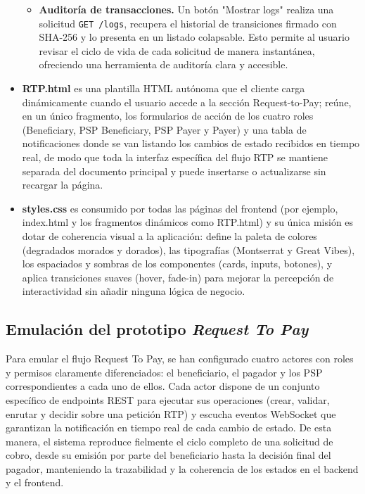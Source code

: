 \begin{itemize}
\begin{itemize}
            \item \textbf{Auditoría de transacciones.} Un botón "Mostrar logs" realiza una solicitud \texttt{GET /logs}, recupera el historial de transiciones firmado con SHA-256 y lo presenta en un listado colapsable. Esto permite al usuario revisar el ciclo de vida de cada solicitud de manera instantánea, ofreciendo una herramienta de auditoría clara y accesible.
        \end{itemize}

    \item \textbf{RTP.html} es una plantilla HTML autónoma que el cliente carga dinámicamente cuando el usuario accede a la sección Request-to-Pay; reúne, en un único fragmento, los formularios de acción de los cuatro roles (Beneficiary, PSP Beneficiary, PSP Payer y Payer) y una tabla de notificaciones donde se van listando los cambios de estado recibidos en tiempo real, de modo que toda la interfaz específica del flujo RTP se mantiene separada del documento principal y puede insertarse o actualizarse sin recargar la página.
    \item \textbf{styles.css} es consumido por todas las páginas del frontend (por ejemplo, index.html y los fragmentos dinámicos como RTP.html) y su única misión es dotar de coherencia visual a la aplicación: define la paleta de colores (degradados morados y dorados), las tipografías (Montserrat y Great Vibes), los espaciados y sombras de los componentes (cards, inputs, botones), y aplica transiciones suaves (hover, fade-in) para mejorar la percepción de interactividad sin añadir ninguna lógica de negocio. 
\end{itemize}

\subsection{Emulación del prototipo \textit{Request To Pay}}
\label{subsec:EmulacionRTP}
Para emular el flujo Request To Pay, se han configurado cuatro actores con roles y permisos claramente diferenciados: el beneficiario, el pagador y los PSP correspondientes a cada uno de ellos. Cada actor dispone de un conjunto específico de endpoints REST para ejecutar sus operaciones (crear, validar, enrutar y decidir sobre una petición RTP) y escucha eventos WebSocket que garantizan la notificación en tiempo real de cada cambio de estado. De esta manera, el sistema reproduce fielmente el ciclo completo de una solicitud de cobro, desde su emisión por parte del beneficiario hasta la decisión final del pagador, manteniendo la trazabilidad y la coherencia de los estados en el backend y el frontend.

